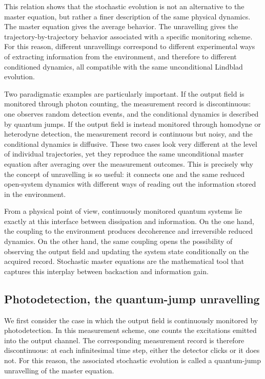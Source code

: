 This relation shows that the stochastic evolution is not an alternative to the master equation, but rather a finer description of the same physical dynamics. The master equation gives the average behavior. The unravelling gives the trajectory-by-trajectory behavior associated with a specific monitoring scheme. For this reason, different unravellings correspond to different experimental ways of extracting information from the environment, and therefore to different conditioned dynamics, all compatible with the same unconditional Lindblad evolution.

Two paradigmatic examples are particularly important. If the output field is monitored through photon counting, the measurement record is discontinuous: one observes random detection events, and the conditional dynamics is described by quantum jumps. If the output field is instead monitored through homodyne or heterodyne detection, the measurement record is continuous but noisy, and the conditional dynamics is diffusive. These two cases look very different at the level of individual trajectories, yet they reproduce the same unconditional master equation after averaging over the measurement outcomes. This is precisely why the concept of unravelling is so useful: it connects one and the same reduced open-system dynamics with different ways of reading out the information stored in the environment.

From a physical point of view, continuously monitored quantum systems lie exactly at this interface between dissipation and information. On the one hand, the coupling to the environment produces decoherence and irreversible reduced dynamics. On the other hand, the same coupling opens the possibility of observing the output field and updating the system state conditionally on the acquired record. Stochastic master equations are the mathematical tool that captures this interplay between backaction and information gain.



\subsection{Photodetection, the quantum-jump unravelling}
\label{subsec:photodetection_quantum_jump_unravelling}

We first consider the case in which the output field is continuously monitored by photodetection. In this measurement scheme, one counts the excitations emitted into the output channel. The corresponding measurement record is therefore discontinuous: at each infinitesimal time step, either the detector clicks or it does not. For this reason, the associated stochastic evolution is called a quantum-jump unravelling of the master equation.

